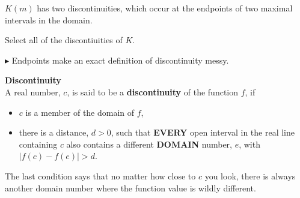 \documentclass{ximera}
\begin{document}
\begin{example}
\begin{image}
\end{image}

$K(m)$ has two discontinuities, which occur at the endpoints of two maximal intervals in the domain.








Select all of the discontiuities of $K$.
\begin{selectAll}
\end{selectAll}





\end{example}


$\blacktriangleright$ Endpoints make an exact definition of discontinuity messy. 







\begin{definition} \textbf{\textcolor{green!50!black}{Discontinuity}}  \\

A real number, $c$, is said to be a \textbf{discontinuity} of the function $f$, if

\begin{itemize}
\item $c$ is a member of the domain of $f$,


\item there is a distance, $d > 0$, such that \textbf{\textcolor{purple!85!blue}{EVERY}} open interval in the real line containing $c$ also contains a different \textbf{\textcolor{purple!85!blue}{DOMAIN}} number, $e$, with $ |f(c) - f(e)| > d $.

\end{itemize}








\end{definition}
The last condition says that no matter how close to $c$ you look, there is always another domain number where the function value is wildly different.
\end{document}
